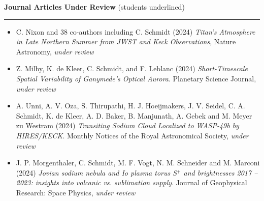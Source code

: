 \documentclass[12pt]{report}
\begin{document}
\vspace{2 mm}
\noindent\textbf{Journal Articles Under Review} (students underlined) \rm\hspace*{\fill} \\
\rule{\textwidth}{1pt}
\begin{itemize} \itemsep -2pt %
  \item C. Nixon and 38 co-authors including C. Schmidt (2024) \textit{Titan's Atmosphere in Late Northern Summer from JWST and Keck Observations}, Nature Astronomy, \textit{under review}
  \item Z. Milby, K. de Kleer, C. Schmidt, and F. Leblanc (2024) \textit{Short-Timescale Spatial Variability of Ganymede’s Optical Aurora}. Planetary Science Journal, \textit{under review}
  \item A. Unni, A. V. Oza, S. Thirupathi, H. J. Hoeijmakers, J. V. Seidel, C. A. Schmidt, K. de Kleer, A. D. Baker, B. Manjunath, A. Gebek and M. Meyer zu Westram (2024) \textit{Transiting Sodium Cloud Localized to WASP-49b by HIRES/KECK}. Monthly Notices of the Royal Astronomical Society, \textit{under review}
  \item J. P. Morgenthaler, C. Schmidt, M. F. Vogt, N. M. Schneider and M. Marconi (2024) \textit{Jovian sodium nebula and Io plasma torus S$^+$ and brightnesses 2017 – 2023: insights into volcanic vs. sublimation supply}. Journal of Geophysical Research: Space Physics, \textit{under review}
 \end{itemize}
\end{document}
